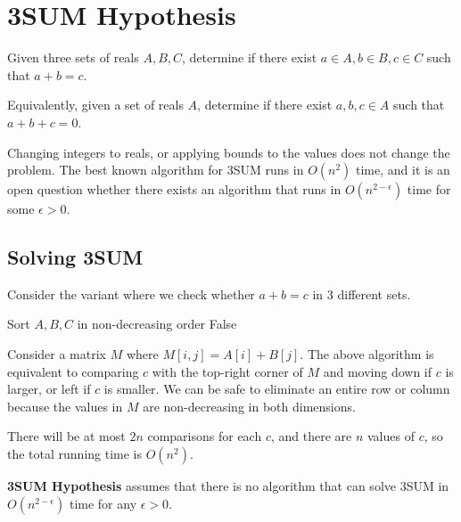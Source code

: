 \chapter{3SUM Hypothesis}

\begin{problem}[3SUM]
Given three sets of reals $A, B, C$, determine if there exist $a \in A, b \in B, c \in C$ such that $a + b = c$.

Equivalently, given a set of reals $A$, determine if there exist $a, b, c \in A$ such that $a + b + c = 0$.
\end{problem}

Changing integers to reals, or applying bounds to the values does not change the problem. The best known algorithm for 3SUM runs in $O(n^2)$ time, and it is an open question whether there exists an algorithm that runs in $O(n^{2-\epsilon})$ time for some $\epsilon > 0$.

\section{Solving 3SUM}

Consider the variant where we check whether $a + b = c$ in 3 different sets.

\begin{algorithm}[H]
	\caption{3SUM} \label{alg:3sum}
	Sort $A, B, C$ in non-decreasing order\;
	\Return False\;
\end{algorithm}

Consider a matrix $M$ where $M[i, j] = A[i] + B[j]$. The above algorithm is equivalent to comparing $c$ with the top-right corner of $M$ and moving down if $c$ is larger, or left if $c$ is smaller. We can be safe to eliminate an entire row or column because the values in $M$ are non-decreasing in both dimensions.

There will be at most $2n$ comparisons for each $c$, and there are $n$ values of $c$, so the total running time is $O(n^2)$.

\begin{definition}
	\textbf{3SUM Hypothesis} assumes that there is no algorithm that can solve 3SUM in $O(n^{2-\epsilon})$ time for any $\epsilon > 0$.
\end{definition}

